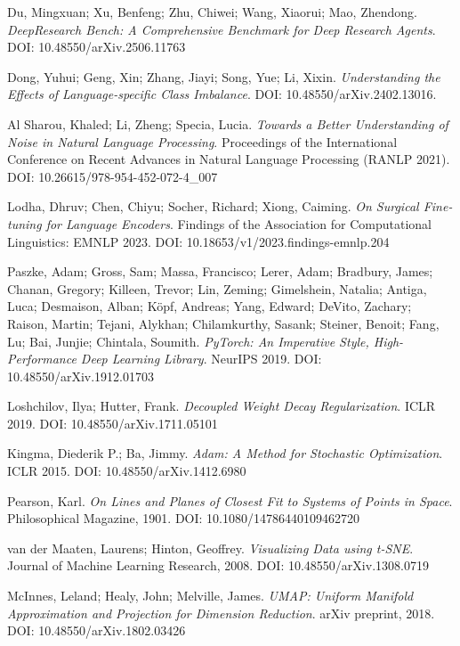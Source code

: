 \documentclass[12pt]{article}
\begin{document}
\begin{thebibliography}{9}
Du, Mingxuan; Xu, Benfeng; Zhu, Chiwei; Wang, Xiaorui; Mao, Zhendong.  
\textit{DeepResearch Bench: A Comprehensive Benchmark for Deep Research Agents}.  
DOI: 10.48550/arXiv.2506.11763  

Dong, Yuhui; Geng, Xin; Zhang, Jiayi; Song, Yue; Li, Xixin.
\textit{Understanding the Effects of Language-specific Class Imbalance}.
DOI: 10.48550/arXiv.2402.13016.

Al Sharou, Khaled; Li, Zheng; Specia, Lucia.
\textit{Towards a Better Understanding of Noise in Natural Language Processing}.
Proceedings of the International Conference on Recent Advances in Natural Language Processing (RANLP 2021).
DOI: 10.26615/978-954-452-072-4\_007

Lodha, Dhruv; Chen, Chiyu; Socher, Richard; Xiong, Caiming.
\textit{On Surgical Fine-tuning for Language Encoders}.
Findings of the Association for Computational Linguistics: EMNLP 2023.
DOI: 10.18653/v1/2023.findings-emnlp.204

Paszke, Adam; Gross, Sam; Massa, Francisco; Lerer, Adam; Bradbury, James; Chanan, Gregory; Killeen, Trevor; Lin, Zeming; Gimelshein, Natalia; Antiga, Luca; Desmaison, Alban; Köpf, Andreas; Yang, Edward; DeVito, Zachary; Raison, Martin; Tejani, Alykhan; Chilamkurthy, Sasank; Steiner, Benoit; Fang, Lu; Bai, Junjie; Chintala, Soumith.
\textit{PyTorch: An Imperative Style, High-Performance Deep Learning Library}.
NeurIPS 2019.
DOI: 10.48550/arXiv.1912.01703

Loshchilov, Ilya; Hutter, Frank.
\textit{Decoupled Weight Decay Regularization}.
ICLR 2019.
DOI: 10.48550/arXiv.1711.05101

Kingma, Diederik P.; Ba, Jimmy.
\textit{Adam: A Method for Stochastic Optimization}.
ICLR 2015.
DOI: 10.48550/arXiv.1412.6980

Pearson, Karl.
\textit{On Lines and Planes of Closest Fit to Systems of Points in Space}.
Philosophical Magazine, 1901.
DOI: 10.1080/14786440109462720

van der Maaten, Laurens; Hinton, Geoffrey.
\textit{Visualizing Data using t-SNE}.
Journal of Machine Learning Research, 2008.
DOI: 10.48550/arXiv.1308.0719

McInnes, Leland; Healy, John; Melville, James.
\textit{UMAP: Uniform Manifold Approximation and Projection for Dimension Reduction}.
arXiv preprint, 2018.
DOI: 10.48550/arXiv.1802.03426


\end{thebibliography}
\end{document}
